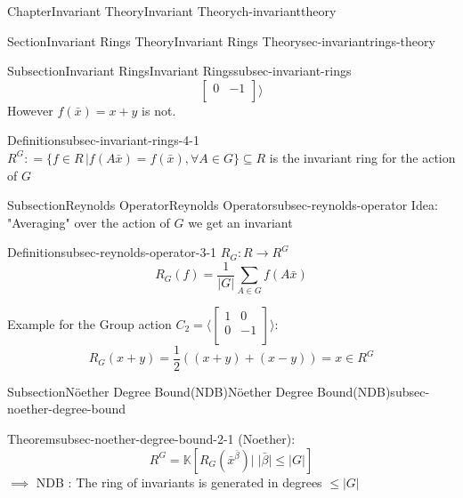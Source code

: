 \documentclass[oneside,10pt,]{book}
\newcommand{\amp}{&}
\begin{document}
\begin{chapterptx}{Chapter}{Invariant Theory}{}{Invariant Theory}{}{}{ch-invarianttheory}
\begin{sectionptx}{Section}{Invariant Rings Theory}{}{Invariant Rings Theory}{}{}{sec-invariantrings-theory}
\begin{subsectionptx}{Subsection}{Invariant Rings}{}{Invariant Rings}{}{}{subsec-invariant-rings}
\begin{equation*}
\begin{bmatrix}
0 \amp -1 \\
\end{bmatrix} \rangle
\end{equation*}
However \(f(\bar x)=x+y\) is not.%
\par
\begin{definition}{Definition}{}{subsec-invariant-rings-4-1}%
\(R^G : =  \{f \in R \, | f(A\bar x) = f(\bar x), \forall A \in G\} \subseteq R\) is the invariant ring for the action of \(G\)%
\end{definition}
%
\end{subsectionptx}
%
%
\typeout{************************************************}
\typeout{************************************************}
%
\begin{subsectionptx}{Subsection}{Reynolds Operator}{}{Reynolds Operator}{}{}{subsec-reynolds-operator}
Idea: "Averaging" over the action of \(G\) we get an invariant%
\par
\begin{definition}{Definition}{}{subsec-reynolds-operator-3-1}%
\(R_G: R \xrightarrow{} R^G\)%
\begin{equation*}
R_G(f) = \frac{1}{|G|} \sum_{A\in G} f(A \bar x) 
\end{equation*}
%
\end{definition}
%
\par
Example for the Group action \(C_2 = \langle\begin{bmatrix}
1 \amp 0 \\
0 \amp -1 \\
\end{bmatrix}\rangle\):%
\begin{equation*}
R_G(x+y) = \frac{1}{2} ((x+y) + (x-y)) = x\in R^G
\end{equation*}
%
\end{subsectionptx}
%
%
\typeout{************************************************}
\typeout{************************************************}
%
\begin{subsectionptx}{Subsection}{Nöether Degree Bound(NDB)}{}{Nöether Degree Bound(NDB)}{}{}{subsec-noether-degree-bound}
\begin{theorem}{Theorem}{}{}{subsec-noether-degree-bound-2-1}%
(Noether):%
\begin{equation*}
R^G = \mathbb{K} [ R_G(\bar x^{\bar \beta}) | \; |\bar \beta| \leq |G|]
\end{equation*}
\(\implies\) NDB : The ring of invariants is generated in degrees \(\leq |G|\)%

\end{theorem}
\end{subsectionptx}
\end{sectionptx}
\end{chapterptx}
\end{document}
